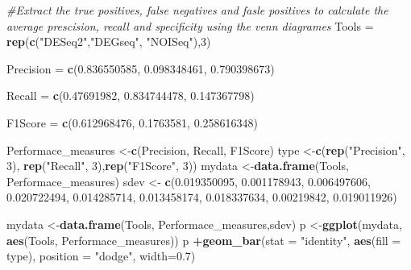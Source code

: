 \documentclass[]{article}
\newenvironment{Shaded}{\begin{snugshade}}{\end{snugshade}}
\newcommand{\CommentTok}[1]{\textcolor[rgb]{0.56,0.35,0.01}{\textit{#1}}}
\newcommand{\DataTypeTok}[1]{\textcolor[rgb]{0.13,0.29,0.53}{#1}}
\newcommand{\DecValTok}[1]{\textcolor[rgb]{0.00,0.00,0.81}{#1}}
\newcommand{\FloatTok}[1]{\textcolor[rgb]{0.00,0.00,0.81}{#1}}
\newcommand{\KeywordTok}[1]{\textcolor[rgb]{0.13,0.29,0.53}{\textbf{#1}}}
\newcommand{\NormalTok}[1]{#1}
\newcommand{\OperatorTok}[1]{\textcolor[rgb]{0.81,0.36,0.00}{\textbf{#1}}}
\newcommand{\StringTok}[1]{\textcolor[rgb]{0.31,0.60,0.02}{#1}}
\begin{document}
\begin{Shaded}
\begin{Highlighting}[]
\CommentTok{#Extract the true positives, false negatives and fasle positives to calculate the average prescision, recall and specificity using the venn diagrames}
\NormalTok{Tools =}\StringTok{ }\KeywordTok{rep}\NormalTok{(}\KeywordTok{c}\NormalTok{(}\StringTok{"DESeq2"}\NormalTok{,}\StringTok{"DEGseq"}\NormalTok{,}
              \StringTok{"NOISeq"}\NormalTok{),}\DecValTok{3}\NormalTok{)}


\NormalTok{Precision  =}\StringTok{ }\KeywordTok{c}\NormalTok{(}\FloatTok{0.836550585}\NormalTok{,}
\FloatTok{0.098348461}\NormalTok{,}
\FloatTok{0.790398673}\NormalTok{)}

\NormalTok{Recall =}\StringTok{ }\KeywordTok{c}\NormalTok{(}\FloatTok{0.47691982}\NormalTok{,}
\FloatTok{0.834744478}\NormalTok{,}
\FloatTok{0.147367798}\NormalTok{)}

\NormalTok{F1Score =}\StringTok{ }\KeywordTok{c}\NormalTok{(}\FloatTok{0.612968476}\NormalTok{,}
\FloatTok{0.1763581}\NormalTok{,}
\FloatTok{0.258616348}\NormalTok{)}

\NormalTok{Performace_measures <-}\KeywordTok{c}\NormalTok{(Precision, Recall, F1Score)}
\NormalTok{type <-}\KeywordTok{c}\NormalTok{(}\KeywordTok{rep}\NormalTok{(}\StringTok{"Precision"}\NormalTok{, }\DecValTok{3}\NormalTok{), }\KeywordTok{rep}\NormalTok{(}\StringTok{"Recall"}\NormalTok{, }\DecValTok{3}\NormalTok{),}\KeywordTok{rep}\NormalTok{(}\StringTok{"F1Score"}\NormalTok{, }\DecValTok{3}\NormalTok{))}
\NormalTok{mydata <-}\KeywordTok{data.frame}\NormalTok{(Tools, Performace_measures)}
\NormalTok{sdev <-}\StringTok{ }\KeywordTok{c}\NormalTok{(}\FloatTok{0.019350095}\NormalTok{,}
          \FloatTok{0.001178943}\NormalTok{,}
          \FloatTok{0.006497606}\NormalTok{, }\FloatTok{0.020722494}\NormalTok{,}
          \FloatTok{0.014285714}\NormalTok{,}
          \FloatTok{0.013458174}\NormalTok{, }\FloatTok{0.018337634}\NormalTok{,}
          \FloatTok{0.00219842}\NormalTok{,}
          \FloatTok{0.019011926}\NormalTok{)}

\NormalTok{mydata <-}\KeywordTok{data.frame}\NormalTok{(Tools, Performace_measures,sdev)}
\NormalTok{p <-}\KeywordTok{ggplot}\NormalTok{(mydata, }\KeywordTok{aes}\NormalTok{(Tools, Performace_measures))}
\NormalTok{p }\OperatorTok{+}\KeywordTok{geom_bar}\NormalTok{(}\DataTypeTok{stat =} \StringTok{"identity"}\NormalTok{, }\KeywordTok{aes}\NormalTok{(}\DataTypeTok{fill =}\NormalTok{ type), }\DataTypeTok{position =} \StringTok{"dodge"}\NormalTok{, }\DataTypeTok{width=}\FloatTok{0.7}\NormalTok{)}
\end{Highlighting}
\end{Shaded}
\end{document}
